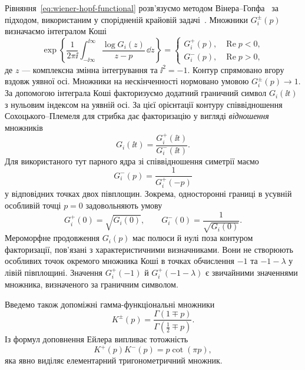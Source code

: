 Рівняння~\eqref{eq:wiener-hopf-functional} розв’язуємо методом Вінера--Гопфа~\citep{noble1958wienerhopf} за підходом, використаним у спорідненій крайовій задачі~\citep{KaminskyDudykPolishchuk2024}. Множники $G_i^\pm(p)$ визначаємо інтегралом Коші
\begin{equation*}
  \exp\left\{
    \frac{1}{2\pi\ii}
    \int_{-\ii\infty}^{\ii\infty}
      \frac{\log G_i(z)}{z-p}\,\dd z
  \right\}
  =
  \begin{cases}
    G_i^+(p), & \operatorname{Re}p<0,\\
    G_i^-(p), & \operatorname{Re}p>0,
  \end{cases}
\end{equation*}
де $z$ — комплексна змінна інтегрування та $\ii^2=-1$. Контур спрямовано вгору вздовж уявної осі. Множники на нескінченності нормовано умовою $G_i^\pm(p)\to1$. За допомогою інтеграла Коші факторизуємо додатний граничний символ $G_i(\ii t)$ з нульовим індексом на уявній осі. За цієї орієнтації контуру співвідношення Сохоцького--Племеля для стрибка дає факторизацію у вигляді \emph{відношення} множників
\begin{equation*}
  G_i(\ii t)=
  \frac{G_i^+(\ii t)}{G_i^-(\ii t)}.
\end{equation*}
Для використаного тут парного ядра зі співвідношення симетрії маємо
\begin{equation}
\label{eq:factor-reflection}
  G_i^-(p)=\frac{1}{G_i^+(-p)}
\end{equation}
у відповідних точках двох півплощин. Зокрема, односторонні границі в усувній особливій точці $p=0$ задовольняють умову
\begin{equation}
\label{eq:factor-zero}
  G_i^+(0)=\sqrt{G_i(0)},\qquad
  G_i^-(0)=\frac{1}{\sqrt{G_i(0)}}.
\end{equation}
Мероморфне продовження $G_i(p)$ має полюси й нулі поза контуром факторизації, пов’язані з характеристичними визначниками. Вони не створюють особливих точок окремого множника Коші в точках обчислення $-1$ та $-1-\lambda$ у лівій півплощині. Значення $G_i^+(-1)$ й $G_i^+(-1-\lambda)$ є звичайними значеннями множника, визначеного за граничним символом.

Введемо також допоміжні гамма-функціональні множники
\begin{equation*}
  K^\pm(p)=
  \frac{\Gamma(1\mp p)}{\Gamma(\tfrac12\mp p)}.
\end{equation*}
Із формул доповнення Ейлера випливає тотожність
\begin{equation}
\label{eq:gamma-factor-identity}
  K^+(p)K^-(p)=p\cot(\pi p),
\end{equation}
яка явно виділяє елементарний тригонометричний множник.

